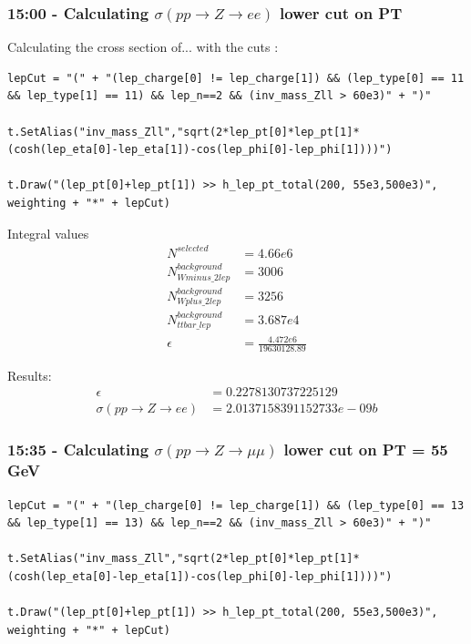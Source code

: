 \subsubsection*{15:00 - Calculating $\sigma(pp \rightarrow Z \rightarrow ee)$ lower cut on PT}
Calculating the cross section of... with the cuts :

\begin{lstlisting}
lepCut = "(" + "(lep_charge[0] != lep_charge[1]) && (lep_type[0] == 11 && lep_type[1] == 11) && lep_n==2 && (inv_mass_Zll > 60e3)" + ")"

t.SetAlias("inv_mass_Zll","sqrt(2*lep_pt[0]*lep_pt[1]*(cosh(lep_eta[0]-lep_eta[1])-cos(lep_phi[0]-lep_phi[1])))")

t.Draw("(lep_pt[0]+lep_pt[1]) >> h_lep_pt_total(200, 55e3,500e3)", weighting + "*" + lepCut)
\end{lstlisting}

Integral values
\begin{align}
    N^{selected} &= 4.66e6
    \\
    N^{background}_{Wminus\_2lep} &= 3006
    \\
    N^{background}_{Wplus\_2lep} &= 3256
    \\
    N^{background}_{ttbar\_lep} &= 3.687e4
    \\
    \epsilon &= \frac{4.472e6}{19630128.89}
\end{align}

Results:
\begin{align}
    \epsilon &= 0.2278130737225129
    \\
    \sigma (pp \rightarrow Z \rightarrow ee) &= 2.0137158391152733e-09 b
\end{align}


\subsubsection*{15:35 - Calculating $\sigma(pp \rightarrow Z \rightarrow \mu\mu)$ lower cut on PT = 55 GeV}

\begin{lstlisting}
lepCut = "(" + "(lep_charge[0] != lep_charge[1]) && (lep_type[0] == 13 && lep_type[1] == 13) && lep_n==2 && (inv_mass_Zll > 60e3)" + ")"

t.SetAlias("inv_mass_Zll","sqrt(2*lep_pt[0]*lep_pt[1]*(cosh(lep_eta[0]-lep_eta[1])-cos(lep_phi[0]-lep_phi[1])))")

t.Draw("(lep_pt[0]+lep_pt[1]) >> h_lep_pt_total(200, 55e3,500e3)", weighting + "*" + lepCut)
\end{lstlisting}

